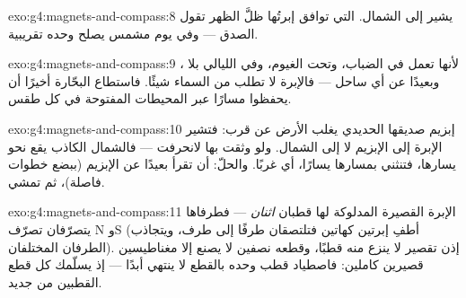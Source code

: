\begin{solution}{exo:g4:magnets-and-compass:8}
يشير إلى الشمال.  التي توافق إبرتُها ظلَّ الظهر تقول
الصدق --- وفي يوم مشمس يصلح  وحده  تقريبية.
\end{solution}

\begin{solution}{exo:g4:magnets-and-compass:9}
لأنها تعمل في الضباب، وتحت الغيوم، وفي الليالي بلا ، وبعيدًا
عن أي ساحل --- فالإبرة لا تطلب من السماء شيئًا. فاستطاع
البحّارة أخيرًا أن يحفظوا مسارًا عبر المحيطات المفتوحة في كل
طقس.
\end{solution}

\begin{solution}{exo:g4:magnets-and-compass:10}
إبزيم صديقها الحديدي يغلب  الأرض عن قرب: فتشير الإبرة
إلى الإبزيم لا إلى الشمال. ولو وثقت بها لانحرفت --- فالشمال
الكاذب يقع نحو يسارها، فتنثني بمسارها يسارًا، أي غربًا. والحلّ:
أن تقرأ  بعيدًا عن الإبزيم (ببضع خطوات فاصلة)، ثم
تمشي.
\end{solution}

\begin{solution}{exo:g4:magnets-and-compass:11}
الإبرة القصيرة المدلوكة لها قطبان \emph{اثنان} --- فطرفاها
يتصرّفان تصرّف N وS (أطفِ إبرتين كهاتين فتلتصقان طرفًا إلى
طرف، ويتجاذب الطرفان المختلفان). إذن تقصير  لا ينزع
منه قطبًا، وقطعه نصفين لا يصنع إلا مغناطيسين قصيرين كاملين:
فاصطياد قطب وحده بالقطع لا ينتهي أبدًا --- إذ يسلّمك كل قطع
القطبين من جديد.
\end{solution}
